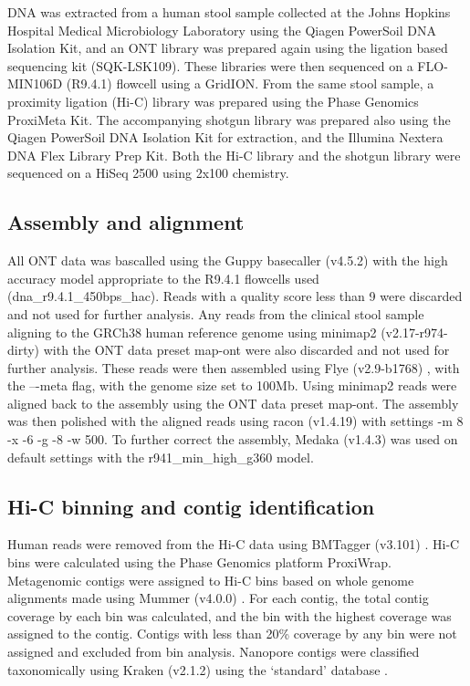 DNA was extracted from a human stool sample collected at the Johns Hopkins Hospital Medical Microbiology Laboratory using the Qiagen PowerSoil DNA Isolation Kit, and an ONT library was prepared again using the ligation based sequencing kit (SQK-LSK109). These libraries were then sequenced on a FLO-MIN106D (R9.4.1) flowcell using a GridION. From the same stool sample, a proximity ligation (Hi-C) library was prepared using the Phase Genomics ProxiMeta Kit. The accompanying shotgun library was prepared also using the Qiagen PowerSoil DNA Isolation Kit for extraction, and the Illumina Nextera DNA Flex Library Prep Kit. Both the Hi-C library and the shotgun library were sequenced on a HiSeq 2500 using 2x100 chemistry.


\subsection{Assembly and alignment}
\label{sec:methods}

All ONT data was bascalled using the Guppy basecaller (v4.5.2) with the high accuracy model appropriate to the R9.4.1 flowcells used (dna\_r9.4.1\_450bps\_hac). Reads with a quality score less than 9 were discarded and not used for further analysis. Any reads from the clinical stool sample aligning to the GRCh38 human reference genome using minimap2 (v2.17-r974-dirty) \citep{Li2018-eq}  with the ONT data preset map-ont were also discarded and not used for further analysis. These reads were then assembled using Flye (v2.9-b1768) \citep{Kolmogorov2020-rm}, with the –-meta flag, with the genome size set to 100Mb. Using minimap2 \citep{Li2018-eq} reads were aligned back to the assembly using the ONT data preset map-ont. The assembly was then polished with the aligned reads using racon \citep{Vaser2017-zk}(v1.4.19) with settings -m 8 -x -6 -g -8 -w 500. To further correct the assembly, Medaka (v1.4.3) was used on default settings with the r941\_min\_high\_g360 model.

\subsection{Hi-C binning and contig identification}
\label{sec:methods}

Human reads were removed from the Hi-C data using BMTagger (v3.101) \citep{Rotmistrovsky2011-ak}. Hi-C bins were calculated using the Phase Genomics platform ProxiWrap. Metagenomic contigs were assigned to Hi-C bins based on whole genome alignments made using Mummer (v4.0.0) \citep{Marcais2018-mm}. For each contig, the total contig coverage by each bin was calculated, and the bin with the highest coverage was assigned to the contig. Contigs with less than 20\% coverage by any bin were not assigned and excluded from bin analysis. Nanopore contigs were classified taxonomically using Kraken (v2.1.2) using the ‘standard’ database \citep{Wood2019-uy}.

